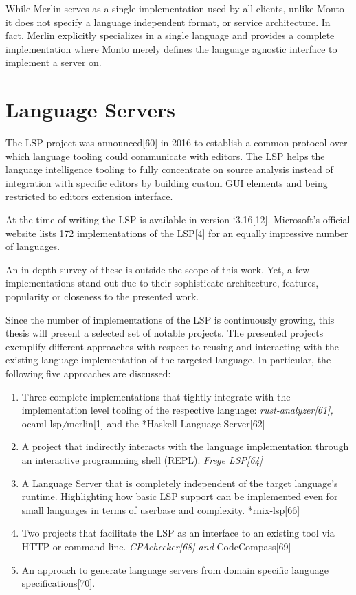 \documentclass[
  a4paper,
  bibtex,
  english,
  nomenclature]{kthlatex/kththesis/kththesis}
\providecommand{\tightlist}{%
  \setlength{\itemsep}{0pt}\setlength{\parskip}{0pt}}
\begin{document}
While Merlin serves as a single implementation used by all clients,
unlike Monto it does not specify a language independent format, or
service architecture. In fact, Merlin explicitly specializes in a single
language and provides a complete implementation where Monto merely
defines the language agnostic interface to implement a server on.

\hypertarget{sec:language-servers}{%
\section{Language Servers}\label{sec:language-servers}}

The LSP project was announced{[}60{]} in 2016 to establish a common
protocol over which language tooling could communicate with editors. The
LSP helps the language intelligence tooling to fully concentrate on
source analysis instead of integration with specific editors by building
custom GUI elements and being restricted to editors extension interface.

At the time of writing the LSP is available in version `3.16{[}12{]}.
Microsoft's official website lists 172 implementations of the LSP{[}4{]}
for an equally impressive number of languages.

An in-depth survey of these is outside the scope of this work. Yet, a
few implementations stand out due to their sophisticate architecture,
features, popularity or closeness to the presented work.

Since the number of implementations of the LSP is continuously growing,
this thesis will present a selected set of notable projects. The
presented projects exemplify different approaches with respect to
reusing and interacting with the existing language implementation of the
targeted language. In particular, the following five approaches are
discussed:

\begin{enumerate}
\def\labelenumi{\arabic{enumi}.}
\tightlist
\item
  Three complete implementations that tightly integrate with the
  implementation level tooling of the respective language:
  \emph{rust-analyzer{[}61{]}, }ocaml-lsp\emph{/}merlin{[}1{]} and the
  *Haskell Language Server{[}62{]}
\item
  A project that indirectly interacts with the language implementation
  through an interactive programming shell (REPL). \emph{Frege
  LSP{[}64{]}}
\item
  A Language Server that is completely independent of the target
  language's runtime. Highlighting how basic LSP support can be
  implemented even for small languages in terms of userbase and
  complexity. *rnix-lsp{[}66{]}
\item
  Two projects that facilitate the LSP as an interface to an existing
  tool via HTTP or command line. \emph{CPAchecker{[}68{]} and
  }CodeCompass{[}69{]}
\item
  An approach to generate language servers from domain specific language
  specifications{[}70{]}.
\end{enumerate}
\end{document}
